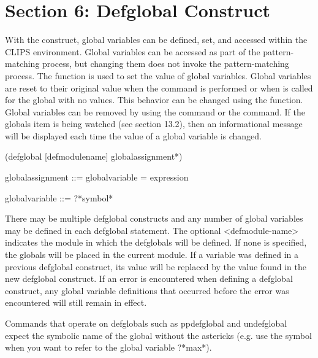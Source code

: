 \documentclass[letterpaper,10pt,english]{sphinxmanual}
\begin{document}
\chapter{Section 6: Defglobal Construct}
\label{\detokenize{defglobal:section-6-defglobal-construct}}\label{\detokenize{defglobal::doc}}
With the  construct, global variables can be defined, set,
and accessed within the CLIPS environment. Global variables can be
accessed as part of the pattern-matching process, but changing them does
not invoke the pattern-matching process. The  function is used
to set the value of global variables. Global variables are reset to
their original value when the  command is performed or when
 is called for the global with no values. This behavior can be
changed using the  function. Global variables can
be removed by using the  command or the 
command. If the globals item is being watched (see section 13.2), then
an informational message will be displayed each time the value of a
global variable is changed.


\begin{sphinxVerbatim}[commandchars=\\\{\}]
(defglobal [\PYGZlt{}defmodule\PYGZhy{}name\PYGZgt{}] \PYGZlt{}global\PYGZhy{}assignment\PYGZgt{}*)

 \PYGZlt{}global\PYGZhy{}assignment\PYGZgt{} ::= \PYGZlt{}global\PYGZhy{}variable\PYGZgt{} = \PYGZlt{}expression\PYGZgt{}

 \PYGZlt{}global\PYGZhy{}variable\PYGZgt{} ::= ?*\PYGZlt{}symbol\PYGZgt{}*
\end{sphinxVerbatim}

There may be multiple defglobal constructs and any number of global
variables may be defined in each defglobal statement. The optional
\textless{}defmodule-name\textgreater{} indicates the module in which the defglobals will be
defined. If none is specified, the globals will be placed in the current
module. If a variable was defined in a previous defglobal construct, its
value will be replaced by the value found in the new defglobal
construct. If an error is encountered when defining a defglobal
construct, any global variable definitions that occurred before the
error was encountered will still remain in effect.

Commands that operate on defglobals such as ppdefglobal and undefglobal
expect the symbolic name of the global without the astericks (e.g. use
the symbol  when you want to refer to the global variable ?*max*).
\end{document}
